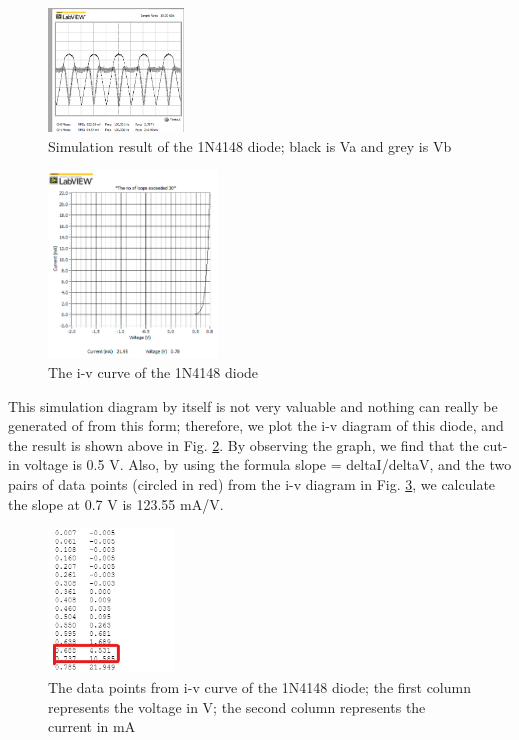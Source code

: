 \documentclass[letterpaper, 10 pt, conference]{ieeeconf}  %
\begin{document}
\begin{figure}[h]
  \centering
  \includegraphics[width=0.32\textwidth]{images/result2.png}
  \caption{Simulation result of the 1N4148 diode; black is Va and grey is Vb}
  \label{fig:3}
\end{figure}
\clearpage
\begin{figure}[h]
  \centering
  \includegraphics[width=0.4\textwidth]{images/result3.png}
  \caption{The i-v curve of the 1N4148 diode}
  \label{fig:4}
\end{figure}
\par This simulation diagram by itself is not very valuable and nothing can really be generated of from this form; therefore, we plot the i-v diagram of this diode, and the result is shown above in Fig. \ref{fig:4}. By observing the graph, we find that the cut-in voltage is 0.5 V. Also, by using the formula slope = deltaI/deltaV, and the two pairs of data points (circled in red) from the i-v diagram in Fig. \ref{fig:5}, we calculate the slope at 0.7 V is 123.55 mA/V.
\begin{figure}[h]
  \centering
  \includegraphics[width=0.3\textwidth]{images/result4.png}
  \caption{The data points from i-v curve of the 1N4148 diode; the first column represents the voltage in V; the second column represents the current in mA}
  \label{fig:5}
\end{figure}
\end{document}
